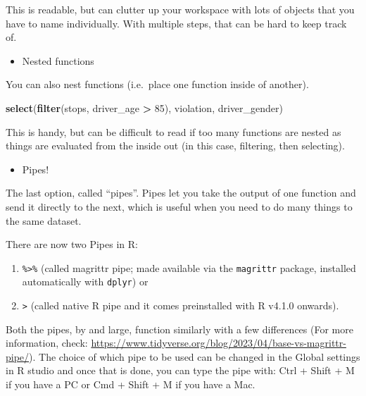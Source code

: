 \documentclass[
]{book}
\newenvironment{Shaded}{\begin{snugshade}}{\end{snugshade}}
\newcommand{\DecValTok}[1]{\textcolor[rgb]{0.00,0.00,0.81}{#1}}
\newcommand{\FunctionTok}[1]{\textcolor[rgb]{0.13,0.29,0.53}{\textbf{#1}}}
\newcommand{\NormalTok}[1]{#1}
\newcommand{\SpecialCharTok}[1]{\textcolor[rgb]{0.81,0.36,0.00}{\textbf{#1}}}
\providecommand{\tightlist}{%
  \setlength{\itemsep}{0pt}\setlength{\parskip}{0pt}}
\begin{document}
This is readable, but can clutter up your workspace with lots of objects that you have to name individually. With multiple steps, that can be hard to keep track of.

\begin{itemize}
\tightlist
\item
  Nested functions
\end{itemize}

You can also nest functions (i.e.~place one function inside of another).

\begin{Shaded}
\begin{Highlighting}[]
\FunctionTok{select}\NormalTok{(}\FunctionTok{filter}\NormalTok{(stops, driver\_age }\SpecialCharTok{\textgreater{}} \DecValTok{85}\NormalTok{), violation, driver\_gender)}
\end{Highlighting}
\end{Shaded}

This is handy, but can be difficult to read if too many functions are nested as things are evaluated from the inside out (in this case, filtering, then selecting).

\begin{itemize}
\tightlist
\item
  Pipes!
\end{itemize}

The last option, called ``pipes''. Pipes let you take
the output of one function and send it directly to the next, which is useful
when you need to do many things to the same dataset.

There are now two Pipes in R:

\begin{enumerate}
\def\labelenumi{\arabic{enumi})}
\item
  \texttt{\%\textgreater{}\%} (called magrittr pipe; made available via the \texttt{magrittr} package, installed automatically with \texttt{dplyr}) or
\item
  \texttt{\textbar{}\textgreater{}} (called native R pipe and it comes preinstalled with R v4.1.0 onwards).
\end{enumerate}

Both the pipes, by and large, function similarly with a few differences (For more information, check: \url{https://www.tidyverse.org/blog/2023/04/base-vs-magrittr-pipe/}). The choice of which pipe to be used can be changed in the Global settings in R studio and once that is done, you can type the pipe with: Ctrl
+ Shift + M if you have a PC or Cmd +
Shift + M if you have a Mac.
\end{document}
